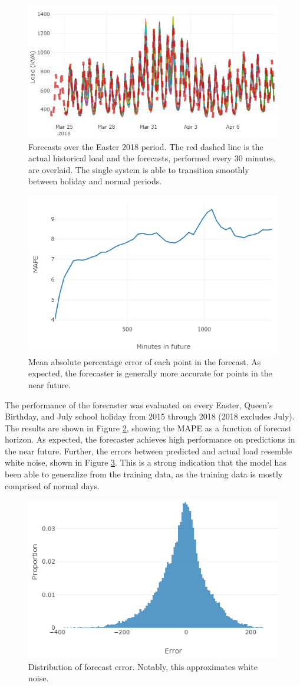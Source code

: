 \documentclass[conference]{IEEEtran}
\begin{document}
\begin{figure}[htbp]
	\centerline{\includegraphics[width=.35\textwidth]{images/easter_2018_all_forecast.png}}
	\caption{Forecasts over the Easter 2018 period.
		The red dashed line is the actual historical load and the forecasts, performed every 30 minutes, are overlaid.
		The single system is able to transition smoothly between holiday and normal periods.}
	\label{fig:easter_forecasts}
\end{figure}

\begin{figure}[htbp]
	\centerline{\includegraphics[width=.35\textwidth]{images/bruny_mape.png}}
	\caption{Mean absolute percentage error of each point in the forecast.
		     As expected, the forecaster is generally more accurate for points in the near future.}
	\label{fig:bruny_mape}
\end{figure}

The performance of the forecaster was evaluated on every Easter, Queen's Birthday, and July school holiday from 2015 through 2018 (2018 excludes July).
The results are shown in Figure \ref{fig:bruny_mape}, showing the MAPE as a function of forecast horizon.
As expected, the forecaster achieves high performance on predictions in the near future.
Further, the errors between predicted and actual load resemble white noise, shown in Figure \ref{fig:bruny_hist}.
This is a strong indication that the model has been able to generalize from the training data, as the training data is mostly comprised of normal days.

\begin{figure}[htbp]
	\centerline{\includegraphics[width=.35\textwidth]{images/errors_histogram.png}}
	\caption{Distribution of forecast error.
		     Notably, this approximates white noise.}
	\label{fig:bruny_hist}
\end{figure}
\end{document}
